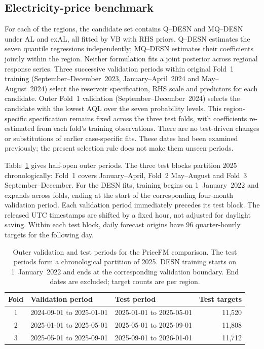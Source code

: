 \documentclass[12pt,letterpaper]{article}
\newcommand{\TableStyle}{\footnotesize\setlength{\tabcolsep}{4pt}\renewcommand{\arraystretch}{1.08}}
\numberwithin{suppalgorithm}{section}
\numberwithin{equation}{section}
\numberwithin{table}{section}
\numberwithin{figure}{section}
\begin{document}
\clearpage
\subsection{Electricity-price benchmark}
\label{subsec:supp_pricefm_diagnostics}

For each of the \PricefmFullRegions{} regions, the candidate set contains
Q--DESN and MQ--DESN under AL and exAL, all fitted by VB with RHS priors.
Q--DESN estimates the seven quantile regressions independently; MQ--DESN
estimates their coefficients jointly within the region. Neither formulation
fits a joint posterior across regional response series.
Three successive validation periods within original Fold~1 training
(September--December~2023, January--April~2024 and May--August~2024)
select the reservoir specification, RHS scale and predictors for each
candidate. Outer Fold~1 validation (September--December~2024) selects the
candidate with the lowest AQL over the seven probability levels. This
region-specific specification remains fixed across the three test folds,
with coefficients re-estimated from each fold's training observations.
There are no test-driven changes or substitutions of earlier case-specific
fits. These dates had been examined previously; the present selection rule
does not make them unseen periods.

Table~\ref{tab:supp-pricefm-fold-design} gives half-open outer periods.
The three test blocks partition 2025 chronologically: Fold~1 covers
January--April, Fold~2 May--August and Fold~3 September--December.
For the DESN fits, training begins on 1~January~2022 and expands across
folds, ending at the start of the corresponding four-month validation
period. Each validation period immediately precedes its test block.
The released UTC timestamps are shifted by a fixed hour, not adjusted
for daylight saving. Within each test block, daily forecast origins have
96 quarter-hourly targets for the following day.

\begin{table}[!htbp]
\centering
\TableStyle
\caption{Outer validation and test periods for the PriceFM comparison.
The test periods form a chronological partition of 2025. DESN training
starts on 1~January~2022 and ends at the corresponding validation boundary.
End dates are excluded; target counts are per region.}
\label{tab:supp-pricefm-fold-design}
\begin{tabular}{@{}cllr@{}}
\toprule
Fold & Validation period & Test period & Test targets \\
\midrule
1 & 2024-09-01 to 2025-01-01 & 2025-01-01 to 2025-05-01 & 11,520 \\
2 & 2025-01-01 to 2025-05-01 & 2025-05-01 to 2025-09-01 & 11,808 \\
3 & 2025-05-01 to 2025-09-01 & 2025-09-01 to 2026-01-01 & 11,712 \\
\bottomrule
\end{tabular}
\end{table}
\end{document}
